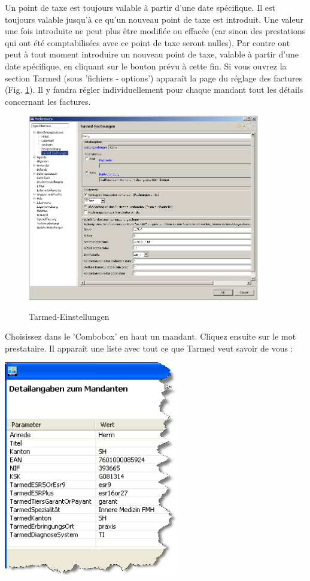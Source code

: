 Un point de taxe est toujours valable à partir d'une date spécifique. Il est toujours valable jusqu'à ce qu'un nouveau point de taxe est introduit. Une valeur une fois introduite ne peut plus être modifiée ou effacée (car sinon des prestations qui ont été comptabilisées avec ce point de taxe seront nulles). Par contre ont peut à tout moment introduire un nouveau point de taxe, valable à partir d'une date spécifique, en cliquant sur le bouton prévu à cette fin.
Si vous ouvrez la section Tarmed (sous 'fichiers - options') apparaît la page du réglage des factures  (Fig. \ref{fig:tarmed2}). Il y faudra régler individuellement pour chaque mandant tout les détails concernant les factures.

\begin{figure}
  \center
  \includegraphics[width=0.9\textwidth]{images/arztrechnung2}\\
  \caption{Tarmed-Einstellungen}\label{fig:tarmed2}
\end{figure}


Choisissez dans le 'Combobox' en haut un mandant. Cliquez ensuite sur le mot prestataire. Il apparaît une liste avec tout ce que Tarmed veut savoir de vous :

\includegraphics[width=3in]{images/tarmed3}


